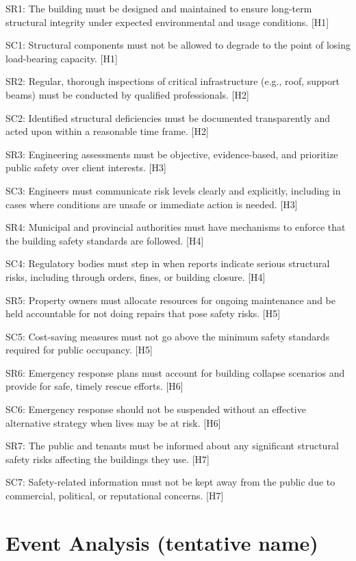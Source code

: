 \documentclass[12pt]{article}
\begin{document}
SR1: The building must be designed and maintained to ensure long-term structural integrity under expected environmental and usage conditions. [H1]

SC1: Structural components must not be allowed to degrade to the point of losing load-bearing capacity. [H1]

SR2: Regular, thorough inspections of critical infrastructure (e.g., roof, support beams) must be conducted by qualified professionals. [H2]

SC2: Identified structural deficiencies must be documented transparently and acted upon within a reasonable time frame. [H2]

SR3: Engineering assessments must be objective, evidence-based, and prioritize public safety over client interests. [H3]

SC3: Engineers must communicate risk levels clearly and explicitly, including in cases where conditions are unsafe or immediate action is needed. [H3]

SR4: Municipal and provincial authorities must have mechanisms to enforce that the building safety standards are followed. [H4]

SC4: Regulatory bodies must step in when reports indicate serious structural risks, including through orders, fines, or building closure. [H4]

SR5: Property owners must allocate resources for ongoing maintenance and be held accountable for not doing repairs that pose safety risks. [H5]

SC5: Cost-saving measures must not go above the minimum safety standards required for public occupancy. [H5]

SR6: Emergency response plans must account for building collapse scenarios and provide for safe, timely rescue efforts. [H6]

SC6: Emergency response should not be suspended without an effective alternative strategy when lives may be at risk. [H6]

SR7: The public and tenants must be informed about any significant structural safety risks affecting the buildings they use. [H7]

SC7: Safety-related information must not be kept away from the public due to commercial, political, or reputational concerns. [H7]




\section{Event Analysis (tentative name)} %
\end{document}
